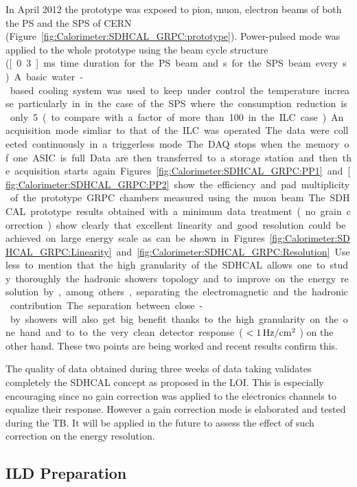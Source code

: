 In April 2012 the prototype was exposed to pion, muon, electron beams of both
the PS and the SPS of CERN (Figure~\ref{fig:Calorimeter:SDHCAL_GRPC:prototype}). Power-pulsed mode was applied to the
whole prototype using the beam cycle structure (\unit[0.3]{ms} time duration for the PS
beam and \unit[9]{s} for the SPS beam every \unit[45]{s}). A basic water-based cooling system was
used to keep under control the temperature increase particularly in in the case
of the SPS where the consumption reduction is only 5 (to compare with a factor
of more than 100 in the ILC case). An acquisition mode simliar to that of the ILC was operated.
The data were collected continuously in a triggerless mode. The DAQ stops when
the memory of one ASIC is full. Data are then transferred to a storage station
and then the acquisition starts again. Figures~\ref{fig:Calorimeter:SDHCAL_GRPC:PP1} and \ref{fig:Calorimeter:SDHCAL_GRPC:PP2} show the efficiency and
pad multiplicity of the prototype GRPC chambers measured using the muon beam.

The SDHCAL prototype results obtained with a minimum data treatment (no grain
correction) show clearly that excellent linearity and good resolution could be
achieved on large energy scale as can be shown in Figures~\ref{fig:Calorimeter:SDHCAL_GRPC:Linearity} and ~\ref{fig:Calorimeter:SDHCAL_GRPC:Resolution}. Useless to
mention that the high granularity of the SDHCAL allows one to study thoroughly
the hadronic showers topology and to improve on the energy resolution by, among
others, separating the electromagnetic and the hadronic contribution. The
separation between close-by showers will also get big benefit thanks to the high
granularity on the one hand and to to the very clean detector response ( $< \unit[1]{Hz/cm^2}$ )
on the other hand. These two points are being worked and recent results confirm this.

The quality of data obtained during three weeks of data taking validates
completely the SDHCAL concept as proposed in the LOI. This is especially
encouraging since no gain correction was applied to the electronics channels to
equalize their response. However a gain correction mode is elaborated and tested
during the TB. It will be applied in the future to assess the effect of such
correction on the energy resolution.


\subsection{ILD Preparation}

